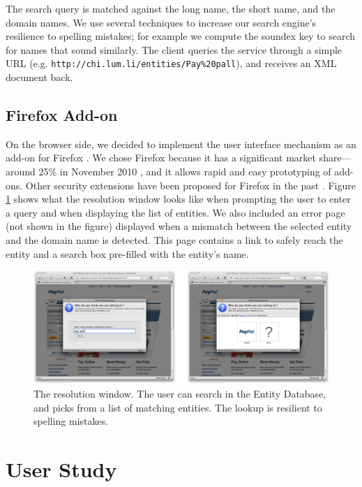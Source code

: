 \documentclass[11pt,styles/chicago]{article}
\begin{document}
The search query is matched against the long name, the short name, and the domain names. We use several techniques to increase our search engine's resilience to spelling mistakes; for example we compute the soundex key \cite{knuth1973art} to search for names that sound similarly. The client queries the service through a simple URL (e.g. \texttt{http://chi.lum.li/entities/Pay\%20pall}), and receives an XML document back.

\subsection{Firefox Add-on}

On the browser side, we decided to implement the user interface mechanism as an add-on for Firefox \cite{Firefox}. We chose Firefox because it has a significant market share---around 25\% in November 2010 \cite{statcounter, netapplications}, and it allows rapid and easy prototyping of add-ons. Other security extensions have been proposed for Firefox in the past \cite{samuel2009requestpolicy}. Figure \ref{fig:screenshots} shows what the resolution window looks like when prompting the user to enter a query and when displaying the list of entities. We also included an error page (not shown in the figure) displayed when a mismatch between the selected entity and the domain name is detected. This page contains a link to safely reach the entity and a search box pre-filled with the entity's name.

\begin{figure}[t]
  \includegraphics[width=\textwidth]{figures/screenshots.png}
  \caption{The resolution window. The user can search in the Entity Database, and picks from a list of matching entities. The lookup is resilient to spelling mistakes.}
  \label{fig:screenshots}
\end{figure}

\section{User Study} %
\end{document}

